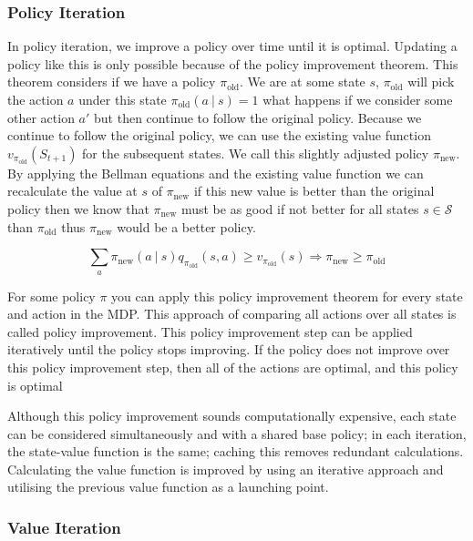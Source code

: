 \documentclass[]{final_report}
\begin{document}
\subsubsection{Policy Iteration}

In policy iteration, we improve a policy over time until it is optimal. Updating a policy like this is only possible because of the policy improvement theorem. This theorem considers if we have a policy $\pi_{\text{old}}$. We are at some state $s$, $\pi_{\text{old}}$ will pick the action $a$ under this state $\pi_{\text{old}}(a\ |\ s) = 1$ what happens if we consider some other action $a'$ but then continue to follow the original policy. Because we continue to follow the original policy, we can use the existing value function $v_{\pi_{\text{old}}}(S_{t+1})$ for the subsequent states. We call this slightly adjusted policy $\pi_{\text{new}}$. By applying the Bellman equations and the existing value function we can recalculate the value at $s$ of $\pi_{\text{new}}$ if this new value is better than the original policy then we know that $\pi_{\text{new}}$ must be as good if not better for all states $s \in \mathcal{S}$ than $\pi_{\text{old}}$ thus $\pi_{\text{new}}$ would be a better policy. 


\begin{equation}
  \sum_a \pi_{\text{new}}(a\ |\ s) q_{\pi_{\text{old}}}(s,a) \ge v_{\pi_{\text{old}}}(s) \Rightarrow  \pi_{\text{new}} \ge \pi_{\text{old}}
  \label{eqn:policy-improvement-theorem}
\end{equation}

For some policy $\pi$ you can apply this policy improvement theorem for every state and action in the MDP. This approach of comparing all actions over all states is called policy improvement. This policy improvement step can be applied iteratively until the policy stops improving. If the policy does not improve over this policy improvement step, then all of the actions are optimal, and this policy is optimal

Although this policy improvement sounds computationally expensive, each state can be considered simultaneously and with a shared base policy; in each iteration, the state-value function is the same; caching this removes redundant calculations. Calculating the value function is improved by using an iterative approach and utilising the previous value function as a launching point.  


\subsubsection{Value Iteration}
\end{document}
